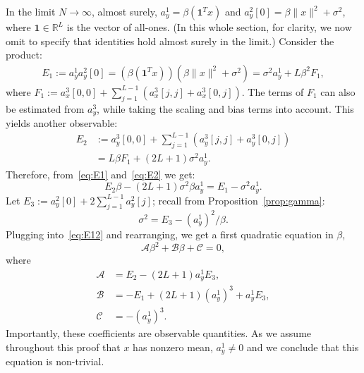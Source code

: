 \documentclass[12pt]{article}
\newcommand{\1}{\mathbf{1}}
\newcommand{\RL}{\mathbb{R}^L}
\newcommand{\one}{\mathbf{1}}
\theoremstyle{plain}
\theoremstyle{definition}
\theoremstyle{remark}
\theoremstyle{plain}
\theoremstyle{remark}
\theoremstyle{plain}
\theoremstyle{plain}
\begin{document}
In the limit $N \to \infty$, almost surely, $a_y^1 = \beta(\one^Tx)$ and $a_y^2[0] = \beta\|x\|^2+\sigma^2$, where $\one\in\RL$ is the vector of all-ones. (In this whole section, for clarity, we now omit to specify that identities hold almost surely in the limit.) Consider the product:
\begin{equation}\label{eq:E1}
\begin{split}
E_1 := a_y^1a_y^2[0] =  (\beta(\one^Tx))(\beta\|x\|^2+\sigma^2)  = \sigma^2a_y^1 + L\beta^2F_1,
\end{split}
\end{equation}
where $F_1 := a_x^3[0,0] + \sum_{j=1}^{L-1}(a_x^3[j,j] + a_x^3[0,j])$. 
The terms of $F_1$ can also be estimated from $a_y^3$, while taking the scaling and bias terms into account. This yields another observable:
\begin{align} 
E_2 & := a_y^3[0,0] + \sum_{j=1}^{L-1}(a_y^3[j,j] + a_y^3[0,j]) \nonumber\\
& = L\beta F_1 + (2L+1)\sigma^2a_y^1. \label{eq:E2}
\end{align}
Therefore, from~\eqref{eq:E1} and~\eqref{eq:E2} we get:
\begin{equation} \label{eq:E12}
E_2\beta -(2L+1)\sigma^2\beta a_y^1 = E_1-\sigma^2a_y^1.
\end{equation}
Let $E_3:=a_y^2[0] + 2\sum_{j = 1}^{L-1}a_y^2[j]$; recall from Proposition~\ref{prop:gamma}:
\begin{equation} \label{eq:sigma2}
\sigma^2 = E_3 - (a^1_y)^2/\beta. 
\end{equation} 
Plugging into~\eqref{eq:E12} and rearranging, we get a first quadratic equation in $\beta$,
\begin{equation} \label{eq:quad1}
\mathcal{A}\beta^2 + \mathcal{B}\beta + \mathcal{C} = 0,
\end{equation}
where 
\begin{align*}
\mathcal{A} &= E_2 - (2L+1)a_y^1E_3, \\ 
\mathcal{B} &= -E_1 + (2L+1)(a_y^1)^3 + a_y^1E_3  , \\
\mathcal{C} &= -(a_y^1)^3.
\end{align*}
Importantly, these coefficients are observable quantities. As we assume throughout this proof that $x$ has nonzero mean, $a_y^1 \neq 0$ and we conclude that this equation is non-trivial.
\end{document}
